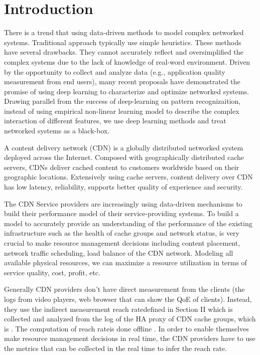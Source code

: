 \documentclass[5p]{elsarticle}
\newcommand{\dabiaolv}{reach rate}
\begin{document}
\section{Introduction}
There is a trend \cite{Jiang2017Pytheas:Exploration-Exploitation} \cite{Mao2017NeuralPensieve} \cite{Li2017} \cite{JiangVIA:Selection} \cite{GaoMachineOptimization} that using data-driven methods to model complex networked systems. Traditional approach typically use simple heuristics. These methods have several drawbacks. They cannot accurately reflect and oversimplified the complex systems due to the lack of knowledge of real-word environment. Driven by the opportunity to collect and analyze data (e.g., application quality measurement from end users), many recent proposals have demonstrated the promise of using deep learning to characterize and optimize networked systems. Drawing parallel from the success of deep-learning on pattern recognizaition, instead of using empirical non-linear learning model to describe the complex interaction of different features, we use deep learning methods and treat networked systems as a black-box.

A content delivery network (CDN) is a globally distributed networked system deployed across the Internet. Composed with geographically distributed cache servers, CDNs deliver cached content  to  customers  worldwide  based  on their geographic locations. Extensively  using  cache  servers,  content  delivery over  CDN  has  low  latency, reliability, supports better quality of experience and security.

The CDN Service providers are increasingly using data-driven mechanisms to build their performance model of their service-providing systems. To build a model to accurately provide an understanding of the performance of the existing infrastructure such as the health of cache groups and network status, is very crucial to make resource management decisions including content placement, network traffic scheduling, load balance of the CDN network. Modeling all available physical resources, we can maximize a resource utilization in terms of service quality, cost, profit, etc.

Generally CDN providers don't have direct measurement from the clients (the logs from video players, web browser that can show the QoE of clients). Instead, they use the indirect measurement \dabiaolv defined in Section II which is collected and analyzed from the log of the HA proxy of CDN cache groups, which is . The computation of \dabiaolv is done offline . In order to enable themselves make resource management decisions in real time, the CDN providers have to use the metrics that can be collected in the real time to infer the \dabiaolv. 
\end{document}
